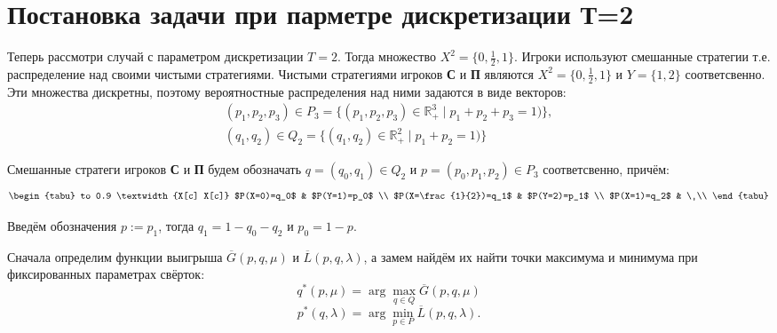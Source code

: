 \section{Постановка задачи при парметре дискретизации Т=2}

Теперь рассмотри случай с параметром дискретизации $T=2$. Тогда множество 
$X^2=\{0, \frac{1}{2}, 1\}$.
Игроки используют смешанные стратегии т.е. распределение над своими чистыми 
стратегиями.
Чистыми стратегиями игроков \textbf{С} и \textbf{П} являются 
$X^2=\{0, \frac{1}{2}, 1\}$ и 
$Y=\{1,2\}$ соответсвенно. Эти множества дискретны, поэтому вероятностные
распределения над ними задаются в виде векторов: 
\begin{gather*}
	(p_1, p_2, p_3) \in P_3 = \{
		(p_1, p_2, p_3) \in \mathbb{R}_+^3 \; | \; p_1 + p_2 + p_3= 1)
	\},
	\\
	(q_1, q_2) \in Q_2 = \{
		(q_1, q_2) \in \mathbb{R}_+^2 \; | \; p_1 + p_2 = 1)
	\}
\end{gather*}

Смешанные стратеги игроков \textbf{С} и \textbf{П} будем обозначать
$q=(q_0,q_1) \in Q_2$ и $p=(p_0, p_1, p_2) \in P_3$ соответсвенно, причём:
\begin{equation}
\begin{tabu} to 0.9 \textwidth {X[c] X[c]}
	$P(X=0)=q_0$ & $P(Y=1)=p_0$ \\
	$P(X=\frac{1}{2})=q_1$ & $P(Y=2)=p_1$ \\
	$P(X=1)=q_2$ & \
	\\
	\end{tabu}	
\label{eq:probability_1}
\end{equation}

Введём обозначения $p := p_1$, тогда $q_1 = 1 - q_0 - q_2$ и $p_0 = 1 - p$. 

Сначала определим функции выигрыша $\overline G(p, q, \mu)$
и $\overline L(p, q, \lambda)$, а замем найдём их
найти точки максимума и минимума при фиксированных параметрах
свёрток:
$$
	q^*(p, \mu) = \arg \max \limits_{q \in Q} \overline G(p, q, \mu)
$$
$$
	p^*(q, \lambda) = \arg \min \limits_{p \in P} \overline L(p, q, \lambda).
$$
